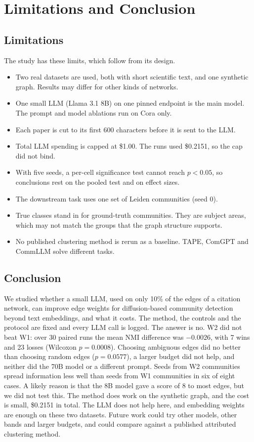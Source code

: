 \documentclass[journal]{IEEEtran}
\begin{document}
\section{Limitations and Conclusion}
\label{sec:concl}
\subsection{Limitations}
The study has these limits, which follow from its design.
\begin{itemize}
\item Two real datasets are used, both with short scientific text, and one synthetic graph. Results may differ for other kinds of networks.
\item One small LLM (Llama 3.1 8B) on one pinned endpoint is the main model. The prompt and model ablations run on Cora only.
\item Each paper is cut to its first 600 characters before it is sent to the LLM.
\item Total LLM spending is capped at \$1.00. The runs used \$0.2151, so the cap did not bind.
\item With five seeds, a per-cell significance test cannot reach $p<0.05$, so conclusions rest on the pooled test and on effect sizes.
\item The downstream task uses one set of Leiden communities (seed 0).
\item True classes stand in for ground-truth communities. They are subject areas, which may not match the groups that the graph structure supports.
\item No published clustering method is rerun as a baseline. TAPE, ComGPT and CommLLM solve different tasks.
\end{itemize}

\subsection{Conclusion}
We studied whether a small LLM, used on only 10\% of the edges of a citation network, can improve edge weights for diffusion-based community detection beyond text embeddings, and what it costs. The method, the controls and the protocol are fixed and every LLM call is logged. The answer is no. W2 did not beat W1: over 30 paired runs the mean NMI difference was $-0.0026$, with 7 wins and 23 losses (Wilcoxon $p=0.0008$). Choosing ambiguous edges did no better than choosing random edges ($p=0.0577$), a larger budget did not help, and neither did the 70B model or a different prompt. Seeds from W2 communities spread information less well than seeds from W1 communities in six of eight cases. A likely reason is that the 8B model gave a score of 8 to most edges, but we did not test this. The method does work on the synthetic graph, and the cost is small, \$0.2151 in total. The LLM does not help here, and embedding weights are enough on these two datasets.
Future work could try other models, other bands and larger budgets, and could compare against a published attributed clustering method.
\end{document}
